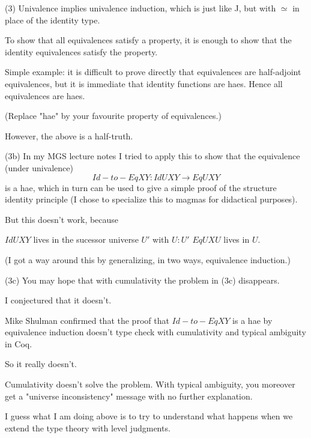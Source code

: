 \documentclass[11pt,a4paper]{article}
\begin{document}
(3) Univalence implies univalence induction, which is just like J, but
     with $\simeq$ in place of the identity type.

     To show that all equivalences satisfy a property, it is enough to
     show that the identity equivalences satisfy the property.

     Simple example: it is difficult to prove directly that
     equivalences are half-adjoint equivalences, but it is immediate
     that identity functions are haes. Hence all equivalences are haes.

     (Replace "hae" by your favourite property of equivalences.)

     However, the above is a half-truth.

(3b) In my MGS lecture notes I tried to apply this to show that the
      equivalence (under univalence)
$$
      Id-to-Eq X Y : Id U X Y →  Eq U X Y
$$
      is a hae, which in turn can be used to give a simple proof of the
      structure identity principle (I chose to specialize this to
      magmas for didactical purposes).

      But this doesn't work, because

          $Id U X Y$ lives in the sucessor universe $U'$ with $U:U'$
          $Eq U X U$ lives in $U$.

      (I got a way around this by generalizing, in two ways,
      equivalence induction.)

(3c) You may hope that with cumulativity the problem in (3c) disappears.

      I conjectured that it doesn't.

      Mike Shulman confirmed that the proof that $Id-to-Eq X Y$ is a hae
      by equivalence induction doesn't type check with cumulativity and
      typical ambiguity in Coq.

      So it really doesn't.

      Cumulativity doesn't solve the problem. With typical ambiguity,
      you moreover get a "universe inconsistency" message with no
      further explanation.

I guess what I am doing above is to try to understand what happens
when we extend the type theory with level judgments.
\end{document}
